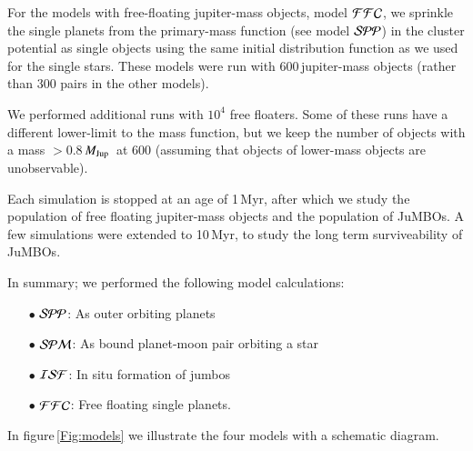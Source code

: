 \documentclass[submission,phys]{lib/SciPost}
\newcommand{\MJup}{\mbox{${M}_{\rm Jup}$}}
\newcommand{\jumbos}{\mbox{JuMBOs}}
\begin{document}
For the models with free-floating jupiter-mass objects, model ${\cal
  FFC}$, we sprinkle the single planets from the primary-mass function
(see model ${\cal SPP}$) in the cluster potential as single objects
using the same initial distribution function as we used for the single
stars.  These models were run with 600\,jupiter-mass objects (rather
than 300 pairs in the other models).

We performed additional runs with $10^4$ free floaters. Some of these
runs have a different lower-limit to the mass function, but we keep
the number of objects with a mass $>0.8$\,\MJup\, at 600 (assuming that
objects of lower-mass objects are unobservable).

Each simulation is stopped at an age of 1\,Myr, after which we study
the population of free floating jupiter-mass objects and the
population of \jumbos. A few simulations were extended to 10\,Myr, to
study the long term surviveability of \jumbos.

In summary; we performed the following model calculations:\\
\begin{itemize}
\item[$\bullet$] ${\cal SPP}$: As outer orbiting planets\\
\item[$\bullet$] ${\cal SPM}$: As bound planet-moon pair orbiting a star\\
\item[$\bullet$] ${\cal ISF}$: In situ formation of jumbos\\
\item[$\bullet$] ${\cal FFC}$: Free floating single planets.\\
\end{itemize}
In figure\,\ref{Fig:models} we illustrate the four models with a
schematic diagram.
\end{document}

